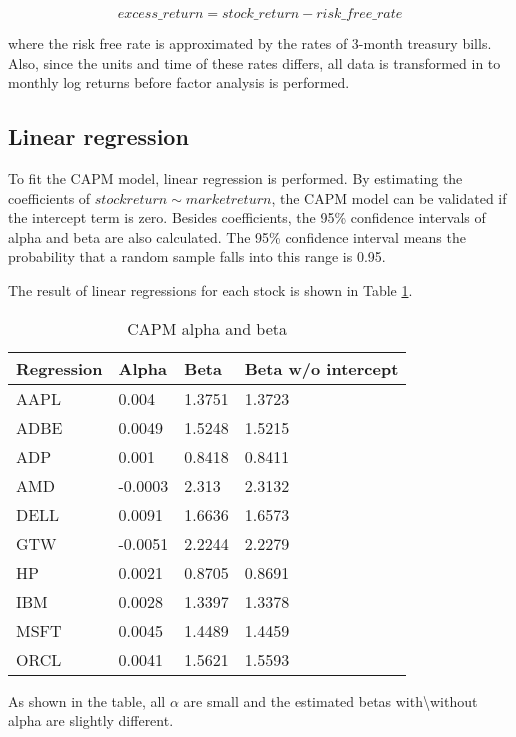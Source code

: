 \documentclass[11pt, conference]{IEEEtran}
\begin{document}
$$ excess\_return = stock\_return - risk\_free\_rate $$

where the risk free rate is approximated by the rates of 3-month treasury bills. Also, since the units and time of these rates differs, all data is transformed in to monthly log returns before factor analysis is performed. 

\subsection{Linear regression}
To fit the CAPM model, linear regression is performed. By estimating the coefficients of $stock return \sim market return$, the CAPM model can be validated if the intercept term is zero. Besides coefficients, the 95\% confidence intervals of alpha and beta are also calculated. The 95\% confidence interval means the probability that a random sample falls into this range is 0.95. 

The result of linear regressions for each stock is shown in Table \ref{tab1}.

\begin{table}[!t]
\centering
\caption{CAPM alpha and beta}
\label{tab1}
\begin{tabular}{llll}
\hline
Regression & Alpha   & Beta   & Beta w/o intercept \\
\hline
AAPL       & 0.004   & 1.3751 & 1.3723             \\
ADBE       & 0.0049  & 1.5248 & 1.5215             \\
ADP        & 0.001   & 0.8418 & 0.8411             \\
AMD        & -0.0003 & 2.313  & 2.3132             \\
DELL       & 0.0091  & 1.6636 & 1.6573             \\
GTW        & -0.0051 & 2.2244 & 2.2279             \\
HP         & 0.0021  & 0.8705 & 0.8691             \\
IBM        & 0.0028  & 1.3397 & 1.3378             \\
MSFT       & 0.0045  & 1.4489 & 1.4459             \\
ORCL       & 0.0041  & 1.5621 & 1.5593            \\
\hline
\end{tabular}
\end{table}

As shown in the table, all $\alpha$ are small and the estimated betas with\textbackslash without alpha are slightly different.  
\end{document}
